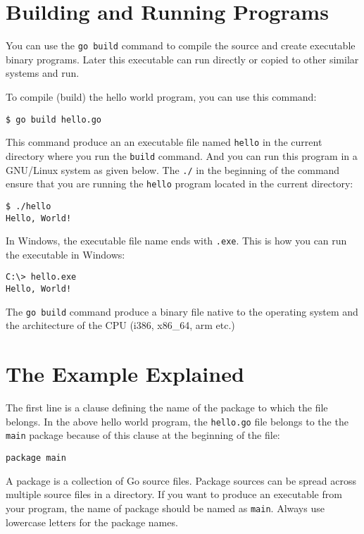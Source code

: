 \section{Building and Running Programs}

You can use the \texttt{go build} command to compile the source and
create executable binary programs.  Later this executable can run
directly or copied to other similar systems and run.

To compile (build) the hello world program, you can use this command:

\begin{lstlisting}[numbers=none]
$ go build hello.go
\end{lstlisting}

This command produce an an executable file named \texttt{hello} in the
current directory where you run the \texttt{build} command.  And you
can run this program in a GNU/Linux system as given below.
The \texttt{./} in the beginning of the command ensure that you are
running the \texttt{hello} program located in the current directory:

\begin{lstlisting}[numbers=none]
$ ./hello
Hello, World!
\end{lstlisting}

In Windows, the executable file name ends with \texttt{.exe}.  This is
how you can run the executable in Windows:

\begin{lstlisting}[numbers=none]
C:\> hello.exe
Hello, World!
\end{lstlisting}

The \texttt{go build} command produce a binary file native to the
operating system and the architecture of the CPU (i386, x86\_64, arm
etc.)

\section{The Example Explained}

The first line is a clause defining the name of the package to which
the file belongs.  In the above hello world program,
the \texttt{hello.go} file belongs to the the \texttt{main} package
because of this clause at the beginning of the file:

\begin{lstlisting}[numbers=none]
package main
\end{lstlisting}

A package is a collection of Go source files.  Package sources can be
spread across multiple source files in a directory.  If you want to
produce an executable from your program, the name of package should be
named as \texttt{main}.  Always use lowercase letters for the package
names.

